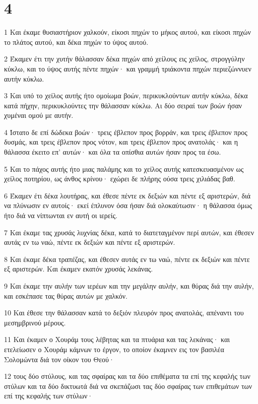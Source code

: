 \chapter{4}

\par 1 Και έκαμε θυσιαστήριον χαλκούν, είκοσι πηχών το μήκος αυτού, και είκοσι πηχών το πλάτος αυτού, και δέκα πηχών το ύψος αυτού.
\par 2 Έκαμεν έτι την χυτήν θάλασσαν δέκα πηχών από χείλους εις χείλος, στρογγύλην κύκλω, και το ύψος αυτής πέντε πηχών· και γραμμή τριάκοντα πηχών περιεζώννυεν αυτήν κύκλω.
\par 3 Και υπό το χείλος αυτής ήτο ομοίωμα βοών, περικυκλούντων αυτήν κύκλω, δέκα κατά πήχην, περικυκλούντες την θάλασσαν κύκλω. Αι δύο σειραί των βοών ήσαν χυμέναι ομού με αυτήν.
\par 4 Ίστατο δε επί δώδεκα βοών· τρεις έβλεπον προς βορράν, και τρεις έβλεπον προς δυσμάς, και τρεις έβλεπον προς νότον, και τρεις έβλεπον προς ανατολάς· και η θάλασσα έκειτο επ' αυτών· και όλα τα οπίσθια αυτών ήσαν προς τα έσω.
\par 5 Και το πάχος αυτής ήτο μιας παλάμης και το χείλος αυτής κατεσκευασμένον ως χείλος ποτηρίου, ως άνθος κρίνου· εχώρει δε πλήρης ούσα τρεις χιλιάδας βαθ.
\par 6 Έκαμεν έτι δέκα λουτήρας, και έθεσε πέντε εκ δεξιών και πέντε εξ αριστερών, διά να πλύνωσιν εν αυτοίς· εκεί έπλυνον όσα ήσαν διά ολοκαύτωσιν· η θάλασσα όμως ήτο διά να νίπτωνται εν αυτή οι ιερείς.
\par 7 Και έκαμε τας χρυσάς λυχνίας δέκα, κατά το διατεταγμένον περί αυτών, και έθεσεν αυτάς εν τω ναώ, πέντε εκ δεξιών και πέντε εξ αριστερών.
\par 8 Και έκαμε δέκα τραπέζας, και έθεσεν αυτάς εν τω ναώ, πέντε εκ δεξιών και πέντε εξ αριστερών. Και έκαμεν εκατόν χρυσάς λεκάνας.
\par 9 Και έκαμε την αυλήν των ιερέων και την μεγάλην αυλήν, και θύρας διά την αυλήν, και εσκέπασε τας θύρας αυτών με χαλκόν.
\par 10 Και έθεσε την θάλασσαν κατά το δεξιόν πλευρόν προς ανατολάς, απέναντι του μεσημβρινού μέρους.
\par 11 Και έκαμεν ο Χουράμ τους λέβητας και τα πτυάρια και τας λεκάνας· και ετελείωσεν ο Χουράμ κάμνων το έργον, το οποίον έκαμνεν εις τον βασιλέα Σολομώντα διά τον οίκον του Θεού·
\par 12 τους δύο στύλους, και τας σφαίρας και τα δύο επιθέματα τα επί της κεφαλής των στύλων και τα δύο δικτυωτά διά να σκεπάζωσι τας δύο σφαίρας των επιθεμάτων των επί της κεφαλής των στύλων·
